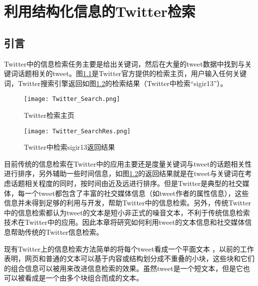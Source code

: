 \chapter{利用结构化信息的Twitter检索}
\label{IR}

\section{引言}
\label{sec:intro}
Twitter中的信息检索任务主要是给出关键词，然后在大量的tweet数据中找到与关键词话题相关的tweet。图\ref{Twitter_Search}是Twitter官方提供的检索主页，用户输入任何关键词，Twitter搜索引擎返回如图\ref{Twitter_SearchRes}的检索结果（Twitter中检索“sigir13”）。

\begin{figure}[htp]
\centering
\texttt{[image: Twitter\_Search.png]}
\caption{Twitter检索主页}
\label{Twitter_Search}
\end{figure}

 \begin{figure}[htp]
\centering
\texttt{[image: Twitter\_SearchRes.png]}
\caption{Twitter中检索sigir13返回结果}
\label{Twitter_SearchRes}
\end{figure}

目前传统的信息检索在Twitter中的应用主要还是度量关键词与tweet的话题相关性进行排序，另外辅助一些时间信息，如图\ref{Twitter_SearchRes}的返回结果就是在tweet与关键词在考虑话题相关程度的同时，按时间由近及远进行排序。但是Twitter是典型的社交媒体，每一个tweet都包含了丰富的社交媒体信息（如tweet作者的属性信息），这些信息并未得到足够的利用与开发，帮助Twitter中的信息检索。另外，传统Twitter中的信息检索都认为tweet的文本是短小非正式的噪音文本，不利于传统信息检索技术在Twitter中的应用。因此本章将研究如何利用tweet的文本信息和社交媒体信息帮助传统的Twitter信息检索。

现有Twitter上的信息检索方法简单的将每个tweet看成一个平面文本 ，以前的工作表明，网页和普通的文本可以基于内容或结构划分成不重叠的小块，这些块和它们的组合信息可以被用来改进信息检索的效果。虽然tweet是一个短文本，但是它也可以被看成是一个由多个块组合而成的文本。

